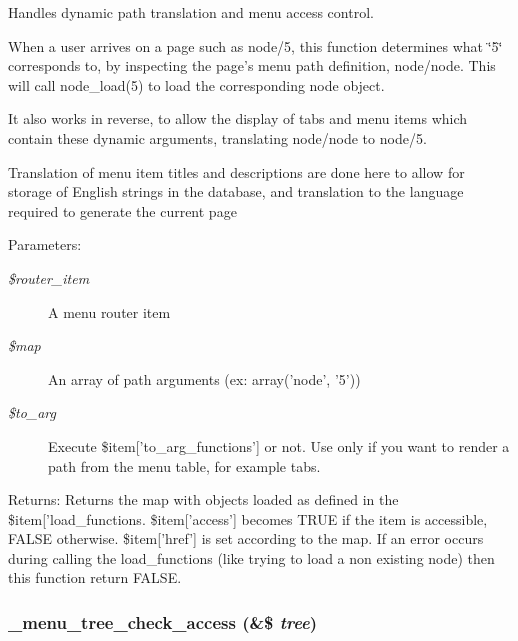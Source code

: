 Handles dynamic path translation and menu access control.

When a user arrives on a page such as node/5, this function determines what \char`\"{}5\char`\"{} corresponds to, by inspecting the page's menu path definition, node/node. This will call node\_\-load(5) to load the corresponding node object.

It also works in reverse, to allow the display of tabs and menu items which contain these dynamic arguments, translating node/node to node/5.

Translation of menu item titles and descriptions are done here to allow for storage of English strings in the database, and translation to the language required to generate the current page

\begin{Desc}
\item[Parameters:]
\begin{description}
\item[{\em \$router\_\-item}]A menu router item \item[{\em \$map}]An array of path arguments (ex: array('node', '5')) \item[{\em \$to\_\-arg}]Execute \$item\mbox{[}'to\_\-arg\_\-functions'\mbox{]} or not. Use only if you want to render a path from the menu table, for example tabs. \end{description}
\end{Desc}
\begin{Desc}
\item[Returns:]Returns the map with objects loaded as defined in the \$item\mbox{[}'load\_\-functions. \$item\mbox{[}'access'\mbox{]} becomes TRUE if the item is accessible, FALSE otherwise. \$item\mbox{[}'href'\mbox{]} is set according to the map. If an error occurs during calling the load\_\-functions (like trying to load a non existing node) then this function return FALSE. \end{Desc}
\hypertarget{group__menu_gd59ba7ae64f452408201f82f8cb7dc25}{
\subsubsection[{\_\-menu\_\-tree\_\-check\_\-access}]{\setlength{\rightskip}{0pt plus 5cm}\_\-menu\_\-tree\_\-check\_\-access (\&\$ {\em tree})}}
\label{group__menu_gd59ba7ae64f452408201f82f8cb7dc25}


